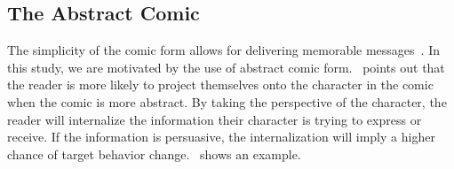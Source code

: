 
\subsection{The Abstract Comic}
The simplicity of the comic form allows for delivering memorable messages~\cite{scott1993understanding}. In this study, we are motivated by the use of abstract comic form.~\textcite{scott1993understanding} points out that the reader is more likely to project themselves onto the character in the comic when the comic is more abstract. By taking the perspective of the character, the reader will internalize the information their character is trying to express or receive. If the information is persuasive, the internalization will imply a higher chance of target behavior change.~ shows an example.





